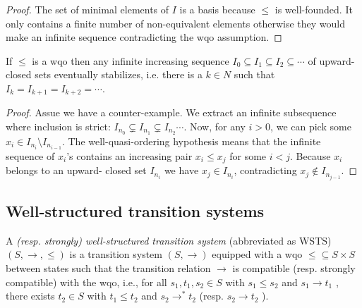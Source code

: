 \begin{proof}
The set of minimal elements of $I$ is a basis because $\leq$ is well-founded. It
only contains a finite number of non-equivalent elements otherwise they would make
an infinite sequence contradicting the wqo assumption.
\end{proof}



\begin{lemma}  \label{upward-closed stablizes}
If $\leq$ is a wqo then any infinite increasing sequence $I_0 \subseteq I_1 \subseteq I_2 \subseteq \cdots$ of
upward-closed sets eventually stabilizes, i.e. there is a $k \in N$ such that 
$I_k = I_{k+1} = I_{k+2} = \cdots $.
\end{lemma}

\begin{proof}
Assue we have a counter-example.
We extract an infinite subsequence where
inclusion is strict: $I_{n_0} \subsetneq I_{n_1} \subsetneq I_{n_2} \cdots$. Now, for any $i>0$, we can pick some $x_i \in I_{n_i} \setminus I_{n_{i-1}}$. The well-quasi-ordering hypothesis means that the infinite sequence of $x_i$'s
contains an increasing pair $x_i \leq x_j$ for some $i<j$. Because $x_i$ belongs to an upward-
closed set $I_{n_i}$ we have $x_j \in I_{n_i} $, contradicting $x_j \not\in I_{n_{ j - 1}}$.
\end{proof}




\subsection{Well-structured transition systems}


\begin{definition}\cite{DBLP:journals/tcs/FinkelS01}
A {\em (resp. strongly) well-structured transition system} (abbreviated as WSTS)  $(S, \rightarrow, \leq)$
is a transition system $(S, \rightarrow)$
equipped with a wqo ${\leq} \subseteq S \times S$ between states such that  
the transition relation $ \rightarrow$ is compatible (resp. strongly compatible) with the wqo, i.e., for all 
$s_1, t_1 , s_2 \in S$
	with $s_1 \leq s_2$  and $s_1 \rightarrow t_1$ , there exists 
	$t_2 \in S$ with 
	$t_1 \leq t_2$ and $s_2 \rightarrow^{*} t_2$ 			
				(resp. $s_2 \rightarrow t_2$ ).
\end{definition}

